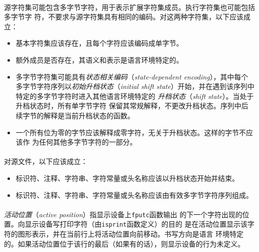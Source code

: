 \paragraph{}
源字符集可能包含多字节字符，用于表示扩展字符集成员。执行字符集也可能包括多字节字
符，不要求与源字符集具有相同的编码。对这两种字符集，以下应该成立：
\begin{itemize}
  \item{基本字符集应该存在，且每个字符应该编码成单字节。}
  \item{额外成员是否存在，其语义和表示是语言环境特定的。}
  \item{多字节字符集可能具有\textit{状态相关编码}（\textit{state-dependent
    encoding}），其中每个多字节字符序列以\textit{初始升档状态}（\textit{initial
    shift state}）开始，并在遇到该序列中特定的多字节字符时进入其他语言环境特定的
    \textit{升档状态}（\textit{shift state}）。当处于升档状态时，所有单字节字符
    保留其常规解释，不更改升档状态。序列中后续字节的解释是当前升档状态的函数。}
  \item{一个所有位为零的字节应该解释成零字符，无关于升档状态。这样的字节不应该作
    为任何其他多字节字符的一部分。}
\end{itemize}

\paragraph{}
对源文件，以下应该成立：
\begin{itemize}
  \item{标识符、注释、字符串、字符常量或头名称应该以升档状态开始并结束。}
  \item{标识符、注释、字符串、字符常量或头名称应该由有效多字节字符序列组成。}
\end{itemize}

\paragraph{}
\textit{活动位置}（\textit{active position}）指显示设备上\texttt{fputc}函数输出
的下一个字符出现的位置。向显示设备写打印字符（由\texttt{isprint}函数定义）的目的
是在活动位置显示该字符的图形表示，并在当前行上将活动位置向前移动。书写方向是语言
环境特定的。如果活动位置位于该行的最后（如果有的话），则显示设备的行为未定义。

